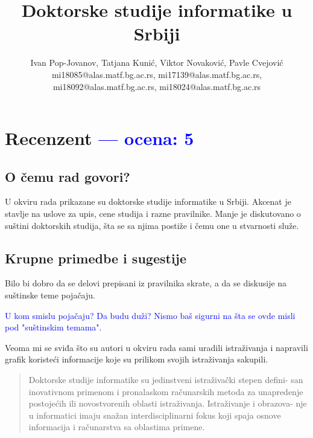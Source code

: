\documentclass[a4paper]{report}
\newcommand{\odgovor}[1]{\textcolor{blue}{#1}}
\begin{document}
\title{Doktorske studije informatike u Srbiji}


\author{Ivan Pop-Jovanov, Tatjana Kunić, Viktor Novaković, Pavle Cvejović\\ mi18085@alas.matf.bg.ac.rs, mi17139@alas.matf.bg.ac.rs, \\mi18092@alas.matf.bg.ac.rs, mi18024@alas.matf.bg.ac.rs}

\maketitle

\tableofcontents
 
\chapter{Recenzent \odgovor{--- ocena: 5} }


\section{O čemu rad govori?}
U okviru rada prikazane su doktorske studije informatike u Srbiji. Akcenat je stavlje na uslove za upis, cene studija i razne pravilnike. Manje je diskutovano o suštini doktorskih studija, šta se sa njima postiže i čemu one u stvarnosti služe.

\section{Krupne primedbe i sugestije}

Bilo bi dobro da se delovi prepisani iz pravilnika skrate, a da se diskusije na suštinske teme pojačaju. 

\odgovor{U kom smislu pojačaju? Da budu duži? Nismo baš sigurni na šta se ovde misli pod "{}suštinskim temama"{}.}

Veoma mi se sviđa što su autori u okviru rada sami uradili istraživanja i napravili grafik koristeći informacije koje su prilikom svojih istraživanja sakupili. 

\begin{quote}
Doktorske studije informatike su jedinstveni istraživački stepen defini-
san inovativnom primenom i pronalaskom računarskih metoda za unapredenje
postojećih ili novostvorenih oblasti istraživanja. Istraživanje i obrazova-
nje u informatici imaju snažan interdisciplinarni fokus koji spaja osnove
informacija i računarstva sa oblastima primene. 
\end{quote}
\end{document}

